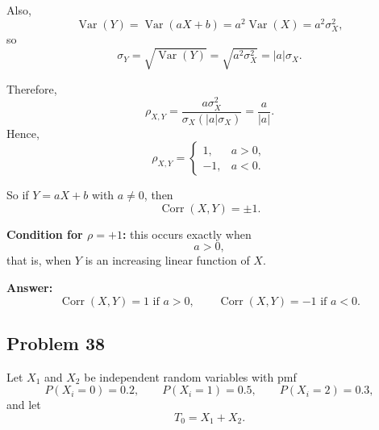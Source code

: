 \documentclass[11pt]{article}
\begin{document}
Also,
\[
\operatorname{Var}(Y)=\operatorname{Var}(aX+b)=a^2\operatorname{Var}(X)=a^2\sigma_X^2,
\]
so
\[
\sigma_Y=\sqrt{\operatorname{Var}(Y)}=\sqrt{a^2\sigma_X^2}=|a|\sigma_X.
\]

Therefore,
\[
\rho_{X,Y}
=\frac{a\sigma_X^2}{\sigma_X(|a|\sigma_X)}
=\frac{a}{|a|}.
\]
Hence,
\[
\rho_{X,Y}=
\begin{cases}
1, & a>0,\\[1ex]
-1, & a<0.
\end{cases}
\]

So if $Y=aX+b$ with $a\ne 0$, then
\[
\operatorname{Corr}(X,Y)=\pm 1.
\]

\textbf{Condition for $\rho=+1$:} this occurs exactly when
\[
a>0,
\]
that is, when $Y$ is an increasing linear function of $X$.

\textbf{Answer:}
\[
\operatorname{Corr}(X,Y)=1 \text{ if } a>0, \qquad \operatorname{Corr}(X,Y)=-1 \text{ if } a<0.
\]

\subsection*{Problem 38}

Let $X_1$ and $X_2$ be independent random variables with pmf
\[
P(X_i=0)=0.2,\qquad P(X_i=1)=0.5,\qquad P(X_i=2)=0.3,
\]
and let
\[
T_0=X_1+X_2.
\]
\end{document}
